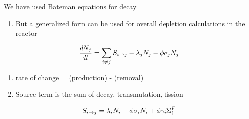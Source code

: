 \documentclass[aspectratio=1610,pdftex,dvipsnames,compress,xcolor={dvipsnames}]{beamer}
\begin{document}
\begin{frame}{We have used Bateman equations for decay}
    \begin{enumerate}[series=outerlist,topsep=0pt,itemsep=21pt,leftmargin=*,label=(\arabic*)]
        \item[]But a generalized form can be used for overall depletion calculations in the reactor
    \end{enumerate}

    \vspace*{\fill}

    \begin{equation}
        \LARGE
        \frac{dN_j}{dt} = \sum_{i \neq j}S_{i \rightarrow j} - \lambda_j N_j - \phi\sigma_j N_j
    \end{equation}

    \vspace*{\fill}

    \begin{enumerate}[series=outerlist,topsep=0pt,itemsep=21pt,leftmargin=*,label=(\arabic*)]
        \item[]rate of change = (production) - (removal)
        \item[]Source term is the sum of decay, transmutation, fission
    \end{enumerate}

    \vspace*{\fill}

    \begin{equation}
        \LARGE 
        S_{i \rightarrow j} = \lambda_i N_i + \phi\sigma_i N_i + \phi\gamma_i\Sigma_i^F
    \end{equation}
\end{frame}
\end{document}
